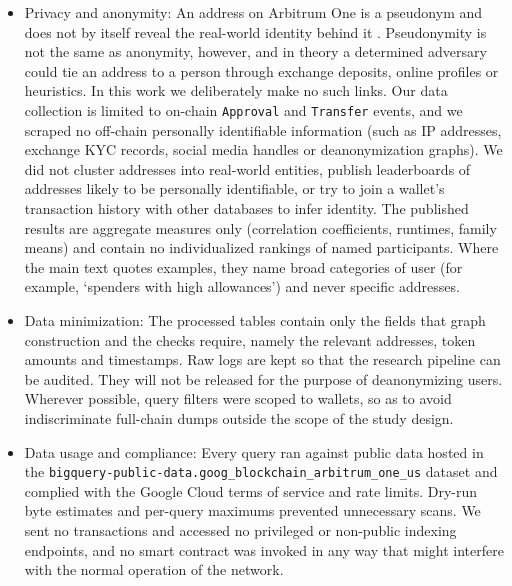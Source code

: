 \begin{itemize}
\item{}\label{sub:privacy-anonymity}
  Privacy and anonymity: An address on Arbitrum One is a pseudonym and does not by itself reveal the real-world identity behind it . Pseudonymity is not the same as anonymity, however, and in theory a determined adversary could tie an address to a person through exchange deposits, online profiles or heuristics. In this work we deliberately make no such links. Our data collection is limited to on-chain \texttt{Approval} and \texttt{Transfer} events, and we scraped no off-chain personally identifiable information (such as IP addresses, exchange KYC records, social media handles or deanonymization graphs). We did not cluster addresses into real-world entities, publish leaderboards of addresses likely to be personally identifiable, or try to join a wallet's transaction history with other databases to infer identity. The published results are aggregate measures only (correlation coefficients, runtimes, family means) and contain no individualized rankings of named participants. Where the main text quotes examples, they name broad categories of user (for example, `spenders with high allowances') and never specific addresses.


\item{}\label{sub:data-minimization}
  Data minimization: The processed tables contain only the fields that graph construction and the checks require, namely the relevant addresses, token amounts and timestamps. Raw logs are kept so that the research pipeline can be audited. They will not be released for the purpose of deanonymizing users. Wherever possible, query filters were scoped to wallets, so as to avoid indiscriminate full-chain dumps outside the scope of the study design.


\item{}\label{sub:data-usage-compliance}
  Data usage and compliance: Every query ran against public data hosted in the \texttt{bigquery-public-data.goog\_blockchain\_arbitrum\_one\_us} dataset and complied with the Google Cloud terms of service and rate limits. Dry-run byte estimates and per-query maximums prevented unnecessary scans. We sent no transactions and accessed no privileged or non-public indexing endpoints, and no smart contract was invoked in any way that might interfere with the normal operation of the network.



\end{itemize}
